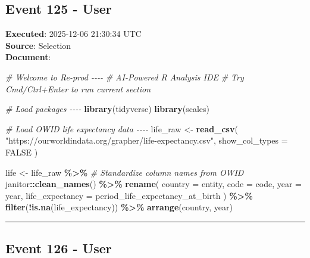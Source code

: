 \documentclass[
  11pt,
]{article}
\newenvironment{Shaded}{\begin{snugshade}}{\end{snugshade}}
\newcommand{\AttributeTok}[1]{\textcolor[rgb]{0.13,0.29,0.53}{#1}}
\newcommand{\CommentTok}[1]{\textcolor[rgb]{0.56,0.35,0.01}{\textit{#1}}}
\newcommand{\ConstantTok}[1]{\textcolor[rgb]{0.56,0.35,0.01}{#1}}
\newcommand{\FunctionTok}[1]{\textcolor[rgb]{0.13,0.29,0.53}{\textbf{#1}}}
\newcommand{\NormalTok}[1]{#1}
\newcommand{\OtherTok}[1]{\textcolor[rgb]{0.56,0.35,0.01}{#1}}
\newcommand{\SpecialCharTok}[1]{\textcolor[rgb]{0.81,0.36,0.00}{\textbf{#1}}}
\newcommand{\StringTok}[1]{\textcolor[rgb]{0.31,0.60,0.02}{#1}}
\begin{document}
\subsection{Event 125 - User}\label{event-125---user}

\textbf{Executed}: 2025-12-06 21:30:34 UTC\\
\textbf{Source}: Selection\\
\textbf{Document}:

\begin{Shaded}
\begin{Highlighting}[]
\CommentTok{\# Welcome to Re{-}prod {-}{-}{-}{-}}
\CommentTok{\# AI{-}Powered R Analysis IDE}
\CommentTok{\# Try Cmd/Ctrl+Enter to run current section}

\CommentTok{\# Load packages {-}{-}{-}{-}}
\FunctionTok{library}\NormalTok{(tidyverse)}
\FunctionTok{library}\NormalTok{(scales)}

\CommentTok{\# Load OWID life expectancy data {-}{-}{-}{-}}
\NormalTok{life\_raw }\OtherTok{\textless{}{-}} \FunctionTok{read\_csv}\NormalTok{(}
  \StringTok{"https://ourworldindata.org/grapher/life{-}expectancy.csv"}\NormalTok{,}
  \AttributeTok{show\_col\_types =} \ConstantTok{FALSE}
\NormalTok{)}

\NormalTok{life }\OtherTok{\textless{}{-}}\NormalTok{ life\_raw }\SpecialCharTok{\%\textgreater{}\%}
  \CommentTok{\# Standardize column names from OWID}
\NormalTok{  janitor}\SpecialCharTok{::}\FunctionTok{clean\_names}\NormalTok{() }\SpecialCharTok{\%\textgreater{}\%}
  \FunctionTok{rename}\NormalTok{(}
    \AttributeTok{country =}\NormalTok{ entity,}
    \AttributeTok{code =}\NormalTok{ code,}
    \AttributeTok{year =}\NormalTok{ year,}
    \AttributeTok{life\_expectancy =}\NormalTok{ period\_life\_expectancy\_at\_birth}
\NormalTok{  ) }\SpecialCharTok{\%\textgreater{}\%}
  \FunctionTok{filter}\NormalTok{(}\SpecialCharTok{!}\FunctionTok{is.na}\NormalTok{(life\_expectancy)) }\SpecialCharTok{\%\textgreater{}\%}
  \FunctionTok{arrange}\NormalTok{(country, year)}
\end{Highlighting}
\end{Shaded}

\begin{center}\rule{0.5\linewidth}{0.5pt}\end{center}

\subsection{Event 126 - User}\label{event-126---user}
\end{document}
